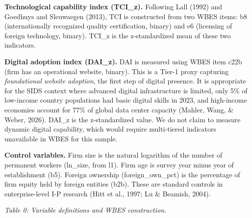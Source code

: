 \documentclass[12pt,a4paper]{article}
\begin{document}
\textbf{Technological capability index (TCI\_z).} Following Lall (1992)
and Goedhuys and Sleuwaegen (2013), TCI is constructed from two WBES
items: b8 (internationally recognized quality certification, binary) and
e6 (licensing of foreign technology, binary). TCI\_z is the
z-standardized mean of these two indicators.

\textbf{Digital adoption index (DAI\_z).} DAI is measured using WBES
item c22b (firm has an operational website, binary). This is a Tier-1
proxy capturing \emph{foundational website adoption}, the first step of
digital presence. It is appropriate for the SIDS context where advanced
digital infrastructure is limited, only 5\% of low-income country
populations had basic digital skills in 2023, and high-income economies
account for 77\% of global data center capacity (Mahler, Wang, \& Weber,
2026). DAI\_z is the z-standardized value. We do not claim to measure
dynamic digital capability, which would require multi-tiered indicators
unavailable in WBES for this sample.

\textbf{Control variables.} Firm size is the natural logarithm of the
number of permanent workers (ln\_size, from l1). Firm age is survey year
minus year of establishment (b5). Foreign ownership (foreign\_own\_pct)
is the percentage of firm equity held by foreign entities (b2b). These
are standard controls in enterprise-level I-P research (Hitt et al.,
1997; Lu \& Beamish, 2004).

\emph{Table 0: Variable definitions and WBES construction.}
\end{document}
